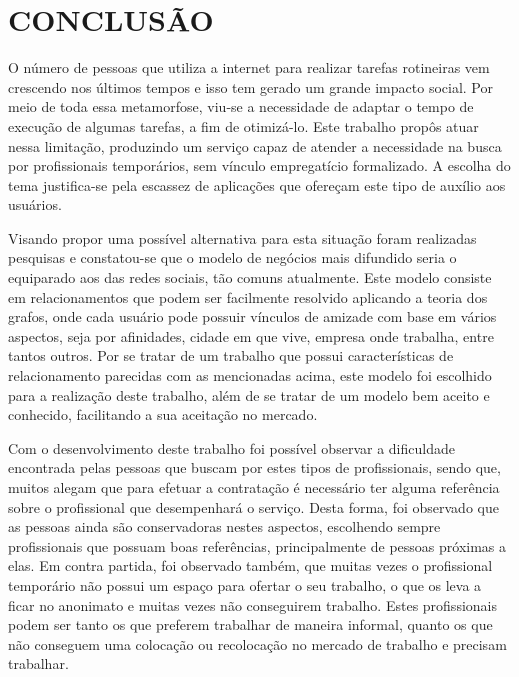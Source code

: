 \chapter{CONCLUSÃO} 


\par O número de pessoas que utiliza a internet para realizar tarefas rotineiras vem crescendo nos últimos tempos e isso tem gerado um grande impacto social. Por meio de toda essa metamorfose, viu-se a necessidade de adaptar o tempo de execução de algumas tarefas, a fim de otimizá-lo.  Este trabalho propôs atuar nessa limitação, produzindo um serviço capaz de atender a necessidade na busca por profissionais temporários, sem vínculo empregatício formalizado. A escolha do tema justifica-se pela escassez de aplicações que ofereçam este tipo de auxílio aos usuários.

\par Visando propor uma possível alternativa para esta situação foram realizadas pesquisas e constatou-se que o modelo de negócios mais difundido seria o equiparado aos das redes sociais, tão comuns atualmente. Este modelo consiste em relacionamentos que podem ser facilmente resolvido aplicando a teoria dos grafos, onde cada usuário pode possuir vínculos de amizade com base em vários aspectos, seja por afinidades, cidade em que vive, empresa onde trabalha, entre tantos outros. Por se tratar de um trabalho que possui características de relacionamento parecidas com as mencionadas acima, este modelo foi escolhido para a realização deste trabalho, além de se tratar de um modelo bem aceito e conhecido, facilitando a sua aceitação no mercado.

\par Com o desenvolvimento deste trabalho foi possível observar a dificuldade encontrada pelas pessoas que buscam por estes tipos de profissionais, sendo que, muitos alegam que para efetuar a contratação é necessário ter alguma referência sobre o profissional que desempenhará o serviço. Desta forma, foi observado que as pessoas ainda são conservadoras nestes aspectos, escolhendo sempre profissionais que possuam boas referências, principalmente de pessoas próximas a elas. Em contra partida, foi observado também, que muitas vezes o profissional temporário não possui um espaço para ofertar o seu trabalho, o que os leva a ficar no anonimato e muitas vezes não conseguirem trabalho. Estes profissionais podem ser tanto os que preferem trabalhar de maneira informal, quanto os que não conseguem uma colocação ou recolocação no mercado de trabalho e precisam trabalhar.

